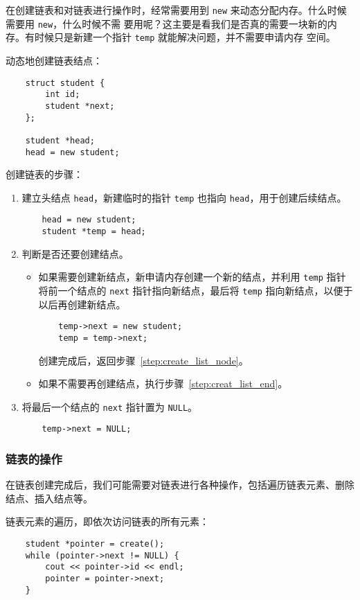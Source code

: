 \documentclass[UTF8]{ctexart}
\begin{document}
在创建链表和对链表进行操作时，经常需要用到 \texttt{new} 来动态分配内存。什么时候需要用 \texttt{new}，什么时候不需
要用呢？这主要是看我们是否真的需要一块新的内存。有时候只是新建一个指针 \texttt{temp} 就能解决问题，并不需要申请内存
空间。

\pagebreak[6]
动态地创建链表结点：
\begin{verbatim}
    struct student {
        int id;
        student *next;
    };

    student *head;
    head = new student;
\end{verbatim}

创建链表的步骤：
\begin{enumerate}
    \item 建立头结点 \texttt{head}，新建临时的指针 \texttt{temp} 也指向 \texttt{head}，用于创建后续结点。
    \begin{verbatim}
    head = new student;
    student *temp = head;
    \end{verbatim}
    \item 判断是否还要创建结点。
    \begin{itemize} \label{step:create_list_node}
        \item 如果需要创建新结点，新申请内存创建一个新的结点，并利用 \texttt{temp} 指针将前一个结点的
        \texttt{next} 指针指向新结点，最后将 \texttt{temp} 指向新结点，以便于以后再创建新结点。
    \begin{verbatim}
    temp->next = new student;
    temp = temp->next;
    \end{verbatim}
        创建完成后，返回步骤~\ref{step:create_list_node}。

        \item 如果不需要再创建结点，执行步骤~\ref{step:creat_list_end}。
    \end{itemize}
    \item \label{step:creat_list_end} 将最后一个结点的 \texttt{next} 指针置为 \texttt{NULL}。
    \begin{verbatim}
    temp->next = NULL;
    \end{verbatim}
\end{enumerate}

\subsubsection{链表的操作}
在链表创建完成后，我们可能需要对链表进行各种操作，包括遍历链表元素、删除结点、插入结点等。

链表元素的遍历，即依次访问链表的所有元素：
\begin{verbatim}
    student *pointer = create();
    while (pointer->next != NULL) {
        cout << pointer->id << endl;
        pointer = pointer->next;
    }
\end{verbatim}
\end{document}
